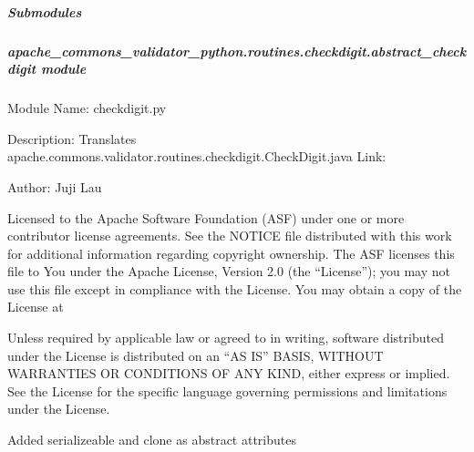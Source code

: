 \documentclass[letterpaper,10pt,english]{sphinxmanual}
\begin{document}
\subparagraph{Submodules}
\label{\detokenize{apache_commons_validator_python.routines.checkdigit:submodules}}

\subparagraph{apache\_commons\_validator\_python.routines.checkdigit.abstract\_checkdigit module}
\label{\detokenize{apache_commons_validator_python.routines.checkdigit:module-apache_commons_validator_python.routines.checkdigit.abstract_checkdigit}}\label{\detokenize{apache_commons_validator_python.routines.checkdigit:apache-commons-validator-python-routines-checkdigit-abstract-checkdigit-module}}
\sphinxAtStartPar
Module Name: checkdigit.py

\sphinxAtStartPar
Description: Translates apache.commons.validator.routines.checkdigit.CheckDigit.java
Link: 

\sphinxAtStartPar
Author: Juji Lau
\begin{description}
\sphinxAtStartPar
Licensed to the Apache Software Foundation (ASF) under one or more
contributor license agreements. See the NOTICE file distributed with
this work for additional information regarding copyright ownership.
The ASF licenses this file to You under the Apache License, Version 2.0
(the “License”); you may not use this file except in compliance with
the License. You may obtain a copy of the License at
\begin{quote}

\sphinxAtStartPar
{}
\end{quote}

\sphinxAtStartPar
Unless required by applicable law or agreed to in writing, software
distributed under the License is distributed on an “AS IS” BASIS,
WITHOUT WARRANTIES OR CONDITIONS OF ANY KIND, either express or implied.
See the License for the specific language governing permissions and
limitations under the License.

\sphinxAtStartPar
Added serializeable and clone as abstract attributes

\end{description}
\end{document}
